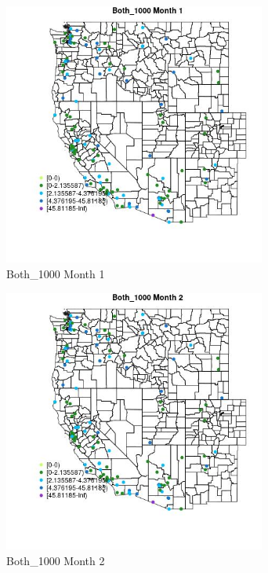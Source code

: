 \begin{figure} 
\centering  
\includegraphics[width=0.77\textwidth]{Code_Outputs/Report_ML_input_PM25_Step4_part_e_de_duplicated_aves_MapObsMo1Both_1000.jpg} 
\caption{\label{fig:Report_ML_input_PM25_Step4_part_e_de_duplicated_avesMapObsMo1Both_1000}Both_1000 Month 1} 
\end{figure} 
 

\begin{figure} 
\centering  
\includegraphics[width=0.77\textwidth]{Code_Outputs/Report_ML_input_PM25_Step4_part_e_de_duplicated_aves_MapObsMo2Both_1000.jpg} 
\caption{\label{fig:Report_ML_input_PM25_Step4_part_e_de_duplicated_avesMapObsMo2Both_1000}Both_1000 Month 2} 
\end{figure} 
 

